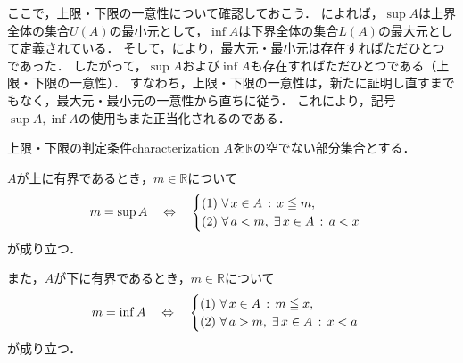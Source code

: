 \begin{remark}[上限・下限の一意性]
  ここで，上限・下限の一意性について確認しておこう．
  によれば，$\sup A$は上界全体の集合$U(A)$の最小元として，$\inf A$は下界全体の集合$L(A)$の最大元として定義されている．
  そして，により，最大元・最小元は存在すればただひとつであった．
  したがって，$\sup A$および$\inf A$も存在すればただひとつである（上限・下限の一意性）．
  すなわち，上限・下限の一意性は，新たに証明し直すまでもなく，最大元・最小元の一意性から直ちに従う．
  これにより，記号$\sup A,\inf A$の使用もまた正当化されるのである．
\end{remark}

\begin{theorem}{上限・下限の判定条件}{characterization}
  $A$を$\mathbb{R}$の空でない部分集合とする．

  $A$が上に有界であるとき，$m \in \mathbb{R}$について
  \[
    m = \sup A
    \quad\mathrel{\Leftrightarrow}\quad
    \begin{cases}
      \textup{(1)}\ \forall\, x \in A \,:\, x \leqq m,\\
      \textup{(2)}\ \forall\, a < m ,\; \exists\, x \in A \,:\, a < x
    \end{cases}
  \]
  が成り立つ．

  また，$A$が下に有界であるとき，$m \in \mathbb{R}$について
  \[
    m = \inf A
    \quad\mathrel{\Leftrightarrow}\quad
    \begin{cases}
      \textup{(1)}\ \forall\, x \in A \,:\, m \leqq x,\\
      \textup{(2)}\ \forall\, a > m ,\; \exists\, x \in A \,:\, x < a
    \end{cases}
  \]
  が成り立つ．
\end{theorem}


